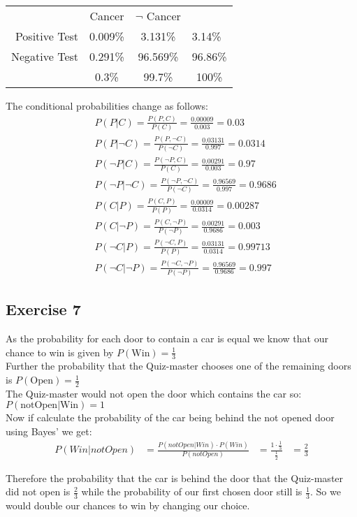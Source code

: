 \begin{tabular}{ r|c|c|l }
\multicolumn{1}{r}{}
 &  \multicolumn{1}{c}{Cancer}
 & \multicolumn{1}{c}{$\neg$ Cancer} \\
\cline{2-3}
Positive Test & 0.009\% & 3.131\% & 3.14\%\\ 
\cline{2-3}
Negative Test & 0.291\% & 96.569\% & 96.86\% \\
\cline{2-3}
\multicolumn{1}{r}{}
 &  \multicolumn{1}{c}{0.3\%}
 & \multicolumn{1}{c}{99.7\%}  & \multicolumn{1}{c}{100\%}\\
\end{tabular}
\newpage
The conditional probabilities change as follows:
\begin{align*}
& P(P|C) = \frac{P(P,C)}{P(C)} = \frac{0.00009}{0.003} = 0.03 \\
& P(P|\neg C) = \frac{P(P,\neg C)}{P(\neg C)} = \frac{0.03131}{0.997} = 0.0314 \\
& P(\neg P|C) = \frac{P(\neg P,C)}{P(C)} = \frac{0.00291}{0.003} = 0.97 \\
& P(\neg P|\neg C) = \frac{P(\neg P,\neg C)}{P(\neg C)} = \frac{0.96569}{0.997}= 0.9686\\
& P(C|P) = \frac{P(C,P)}{P(P)} = \frac{0.00009}{0.0314} = 0.00287 \\
& P(C|\neg P) = \frac{P(C,\neg P)}{P(\neg P)} = \frac{0.00291}{0.9686} = 0.003 \\
& P(\neg C|P) = \frac{P(\neg C,P)}{P(P)} = \frac{0.03131}{0.0314} = 0.99713 \\
& P(\neg C|\neg P) = \frac{P(\neg C,\neg P)}{P(\neg P)} = \frac{0.96569}{0.9686}= 0.997 
\end{align*}

\subsection*{Exercise 7}

As the probability for each door to contain a car is equal we know that our chance to win is given by $P(\mbox{Win}) = \frac{1} 3$\\
Further the probability that the Quiz-master chooses one of the remaining doors is
$P(\mbox{Open}) = \frac{1} 2$\\
The Quiz-master would not open the door which contains the car so: \\
$P(\mbox{notOpen}|\mbox{Win}) = 1$\\
Now if calculate the probability of the car being behind the not opened door using Bayes' we get:
\begin{align*}
& & P(Win|notOpen) & = \frac{P(notOpen|Win) \cdot P(Win)}{P(notOpen)} & = \frac{1 \cdot \frac{1}{3}}{\frac{1}{2}} &= \frac{2}{3}& &
\end{align*}

Therefore the probability that the car is behind the door that the Quiz-master did not open is $\frac{2}{3}$ while the probability of our first chosen door still is $\frac{1}{3}$. So we would double our chances to win by changing our choice.